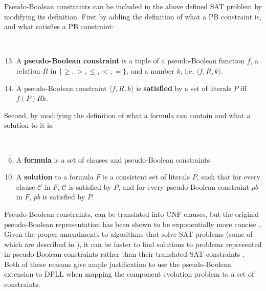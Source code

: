 Pseudo-Boolean constraints can be included in the above defined SAT problem by modifying its definition.
First by adding the definition of what a PB constraint is, and what satisfies a PB constraint:
\begin{defs}
{\ }
\begin{enumerate}
\setcounter{enumi}{12}
  \item A \textbf{pseudo-Boolean constraint} is a tuple of a pseudo-Boolean function $f$, a relation $R$ in $\{\geq,>,\leq,<,=\}$, and a number $k$, i.e. $\langle f,R,k\rangle$.
  \item A pseudo-Boolean constraint $\langle f,R,k\rangle$ is \textbf{satisfied} by a set of literals $P$ iff $ f(P) R k$.
\end{enumerate}
\end{defs}

Second, by modifying the definition of what a formula can contain and what a solution to it is:
\begin{defs}
{\ }
\begin{enumerate}
\setcounter{enumi}{5}
	\item A \textbf{formula} is a set of clauses and pseudo-Boolean constraints
\end{enumerate}
\begin{enumerate}
\setcounter{enumi}{9}
	\item A \textbf{solution} to a formula $F$ is a consistent set of literals $P$, such that for every clause $\mathcal{C}$ in $F$, $\mathcal{C}$ is satisfied by $P$,
	and for every pseudo-Boolean constraint $pb$ in $F$, $pb$ is satisfied by $P$. 
\end{enumerate}
\end{defs}

Pseudo-Boolean constraints, can be translated into CNF clauses, but the original pseudo-Boolean representation has been shown to be exponentially more concise \citep{dixon2004automating}.
Given the proper amendments to algorithms that solve SAT problems (some of which are described in \citep{Sheini2006}), 
it can be faster to find solutions to problems represented in pseudo-Boolean constraints rather than their translated SAT constraints \citep{dixon2004automating}.
Both of these reasons give ample justification to use the pseudo-Boolean extension to DPLL when mapping the component evolution problem to a set of constraints. 

